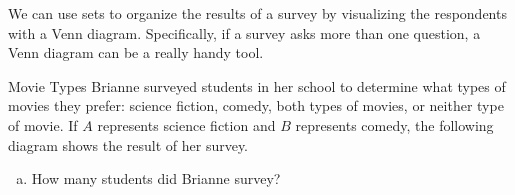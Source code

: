 \setcounter{ExampleCounter}{1}
We can use sets to organize the results of a survey by visualizing the respondents with a Venn diagram.  Specifically, if a survey asks more than one question, a Venn diagram can be a really handy tool.

\begin{example}[https://www.youtube.com/watch?v=Nkay8g-5suM]{Movie Types}
Brianne surveyed students in her school to determine what types of movies they prefer: science fiction, comedy, both types of movies, or neither type of movie.  If $A$ represents science fiction and $B$ represents comedy, the following diagram shows the result of her survey.

\begin{center}
\end{center}

\begin{enumerate}[(a)]
\item How many students did Brianne survey?\\


\end{enumerate}
\end{example}
